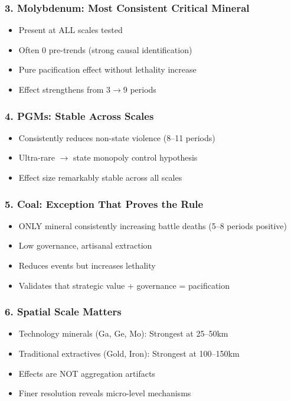 \documentclass[11pt]{article}
\begin{document}
\subsubsection{3. Molybdenum: Most Consistent Critical Mineral}
\begin{itemize}
\item Present at ALL scales tested
\item Often 0 pre-trends (strong causal identification)
\item Pure pacification effect without lethality increase
\item Effect strengthens from 3$\rightarrow$9 periods
\end{itemize}

\subsubsection{4. PGMs: Stable Across Scales}
\begin{itemize}
\item Consistently reduces non-state violence (8--11 periods)
\item Ultra-rare $\rightarrow$ state monopoly control hypothesis
\item Effect size remarkably stable across all scales
\end{itemize}

\subsubsection{5. Coal: Exception That Proves the Rule}
\begin{itemize}
\item ONLY mineral consistently increasing battle deaths (5--8 periods positive)
\item Low governance, artisanal extraction
\item Reduces events but increases lethality
\item Validates that strategic value + governance = pacification
\end{itemize}

\subsubsection{6. Spatial Scale Matters}
\begin{itemize}
\item Technology minerals (Ga, Ge, Mo): Strongest at 25--50km
\item Traditional extractives (Gold, Iron): Strongest at 100--150km
\item Effects are NOT aggregation artifacts
\item Finer resolution reveals micro-level mechanisms
\end{itemize}
\end{document}
